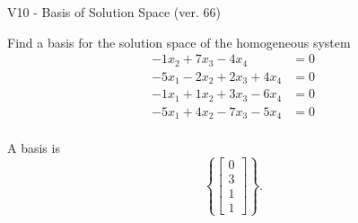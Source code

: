 \begin{exercise}
  \begin{exerciseTitle}V10 - Basis of Solution Space (ver. 66)\end{exerciseTitle}
  \begin{exerciseStatement}
    Find a basis for the solution space of the homogeneous system 
\begin{align*}
 -1 x_ 2 + 7 x_ 3 -4 x_ 4 &= 0  \\ 
  -5 x_ 1 -2 x_ 2 + 2 x_ 3 + 4 x_ 4 &= 0  \\ 
  -1 x_ 1 + 1 x_ 2 + 3 x_ 3 -6 x_ 4 &= 0  \\ 
  -5 x_ 1 + 4 x_ 2 -7 x_ 3 -5 x_ 4 &= 0  \\ 
 \end{align*}


 
  \end{exerciseStatement}

  \begin{exerciseAnswer}
   A basis is   
\[\left\{\left[\begin{array}{c}
0 \\
3 \\
1 \\
1
\end{array}\right]\right\}.\]

  


  \end{exerciseAnswer}
\end{exercise}